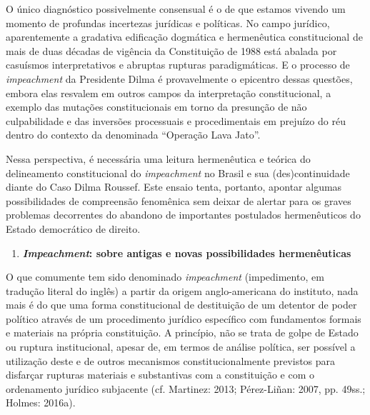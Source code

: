 O único diagnóstico possivelmente consensual é o de que estamos vivendo
um momento de profundas incertezas jurídicas e políticas. No campo
jurídico, aparentemente a gradativa edificação dogmática e hermenêutica
constitucional de mais de duas décadas de vigência da Constituição de
1988 está abalada por casuísmos interpretativos e abruptas rupturas
paradigmáticas. E o processo de \emph{impeachment} da Presidente Dilma é
provavelmente o epicentro dessas questões, embora elas resvalem em
outros campos da interpretação constitucional, a exemplo das mutações
constitucionais em torno da presunção de não culpabilidade e das
inversões processuais e procedimentais em prejuízo do réu dentro do
contexto da denominada ``Operação Lava Jato''.

Nessa perspectiva, é necessária uma leitura hermenêutica e teórica do
delineamento constitucional do \emph{impeachment} no Brasil e sua
(des)continuidade diante do Caso Dilma Roussef. Este ensaio tenta,
portanto, apontar algumas possibilidades de compreensão fenomênica sem
deixar de alertar para os graves problemas decorrentes do abandono de
importantes postulados hermenêuticos do Estado democrático de direito.

\begin{enumerate}
\def\labelenumi{\arabic{enumi}.}
\item
  \textbf{\emph{Impeachment}: sobre antigas e novas possibilidades
  hermenêuticas}
\end{enumerate}

O que comumente tem sido denominado \emph{impeachment} (impedimento, em
tradução literal do inglês) a partir da origem anglo-americana do
instituto, nada mais é do que uma forma constitucional de destituição de
um detentor de poder político através de um procedimento jurídico
específico com fundamentos formais e materiais na própria constituição.
A princípio, não se trata de golpe de Estado ou ruptura institucional,
apesar de, em termos de análise política, ser possível a utilização
deste e de outros mecanismos constitucionalmente previstos para
disfarçar rupturas materiais e substantivas com a constituição e com o
ordenamento jurídico subjacente (cf. Martinez: 2013; Pérez-Liñan: 2007,
pp. 49ss.; Holmes: 2016a).

